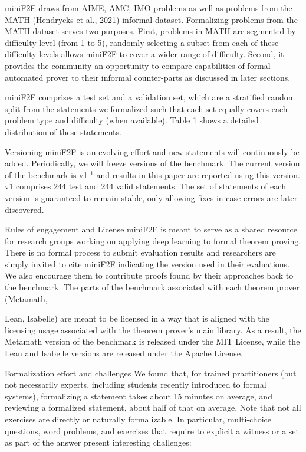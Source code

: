 \documentclass[
]{article}
\begin{document}
miniF2F draws from AIME, AMC, IMO problems as well as problems from the
MATH (Hendrycks et al., 2021) informal dataset. Formalizing problems
from the MATH dataset serves two purposes. First, problems in MATH are
segmented by difficulty level (from 1 to 5), randomly selecting a subset
from each of these difficulty levels allows miniF2F to cover a wider
range of difficulty. Second, it provides the community an opportunity to
compare capabilities of formal automated prover to their informal
counter-parts as discussed in later sections.

miniF2F comprises a test set and a validation set, which are a
stratified random split from the statements we formalized such that each
set equally covers each problem type and difficulty (when available).
Table 1 shows a detailed distribution of these statements.

Versioning miniF2F is an evolving effort and new statements will
continuously be added. Periodically, we will freeze versions of the
benchmark. The current version of the benchmark is v1 \(^{1}\) and
results in this paper are reported using this version. v1 comprises 244
test and 244 valid statements. The set of statements of each version is
guaranteed to remain stable, only allowing fixes in case errors are
later discovered.

Rules of engagement and License miniF2F is meant to serve as a shared
resource for research groups working on applying deep learning to formal
theorem proving. There is no formal process to submit evaluation results
and researchers are simply invited to cite miniF2F indicating the
version used in their evaluations. We also encourage them to contribute
proofs found by their approaches back to the benchmark. The parts of the
benchmark associated with each theorem prover (Metamath,

Lean, Isabelle) are meant to be licensed in a way that is aligned with
the licensing usage associated with the theorem prover's main library.
As a result, the Metamath version of the benchmark is released under the
MIT License, while the Lean and Isabelle versions are released under the
Apache License.

Formalization effort and challenges We found that, for trained
practitioners (but not necessarily experts, including students recently
introduced to formal systems), formalizing a statement takes about 15
minutes on average, and reviewing a formalized statement, about half of
that on average. Note that not all exercises are directly or naturally
formalizable. In particular, multi-choice questions, word problems, and
exercises that require to explicit a witness or a set as part of the
answer present interesting challenges:
\end{document}
